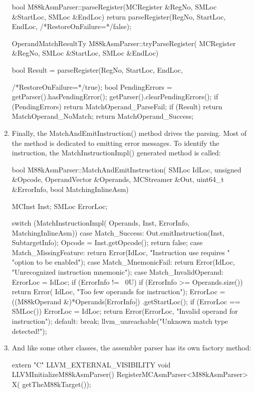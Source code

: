 \begin{enumerate}
\begin{cpp}
bool M88kAsmParser::parseRegister(MCRegister &RegNo,
                                    SMLoc &StartLoc,
                                    SMLoc &EndLoc) {
    return parseRegister(RegNo, StartLoc, EndLoc,
                         /*RestoreOnFailure=*/false);
}

OperandMatchResultTy M88kAsmParser::tryParseRegister(
        MCRegister &RegNo, SMLoc &StartLoc, SMLoc &EndLoc) {
    bool Result =
        parseRegister(RegNo, StartLoc, EndLoc,

    /*RestoreOnFailure=*/true);
    bool PendingErrors = getParser().hasPendingError();
    getParser().clearPendingErrors();
    if (PendingErrors)
        return MatchOperand_ParseFail;
    if (Result)
        return MatchOperand_NoMatch;
    return MatchOperand_Success;
}
\end{cpp}

\item
Finally, the MatchAndEmitInstruction() method drives the parsing. Most of the method is dedicated to emitting error messages. To identify the instruction, the MatchInstructionImpl() generated method is called:

\begin{cpp}
bool M88kAsmParser::MatchAndEmitInstruction(
        SMLoc IdLoc, unsigned &Opcode,
        OperandVector &Operands, MCStreamer &Out,
        uint64_t &ErrorInfo, bool MatchingInlineAsm) {
    MCInst Inst;
    SMLoc ErrorLoc;

    switch (MatchInstructionImpl(
            Operands, Inst, ErrorInfo, MatchingInlineAsm)) {
    case Match_Success:
        Out.emitInstruction(Inst, SubtargetInfo);
        Opcode = Inst.getOpcode();
        return false;
    case Match_MissingFeature:
        return Error(IdLoc, "Instruction use requires "
                     "option to be enabled");
    case Match_MnemonicFail:
        return Error(IdLoc,
                     "Unrecognized instruction mnemonic");
    case Match_InvalidOperand: {
        ErrorLoc = IdLoc;
        if (ErrorInfo != ~0U) {
            if (ErrorInfo >= Operands.size())
                return Error(
                    IdLoc, "Too few operands for instruction");
            ErrorLoc = ((M88kOperand &)*Operands[ErrorInfo])
                    .getStartLoc();
            if (ErrorLoc == SMLoc())
                ErrorLoc = IdLoc;
        }
        return Error(ErrorLoc,
                     "Invalid operand for instruction");
    }
    default:
        break;
    }
    llvm_unreachable("Unknown match type detected!");
}
\end{cpp}

\item
And like some other classes, the assembler parser has its own factory method:

\begin{cpp}
extern "C" LLVM_EXTERNAL_VISIBILITY void
LLVMInitializeM88kAsmParser() {
    RegisterMCAsmParser<M88kAsmParser> X(
        getTheM88kTarget());
}
\end{cpp}
\end{enumerate}

